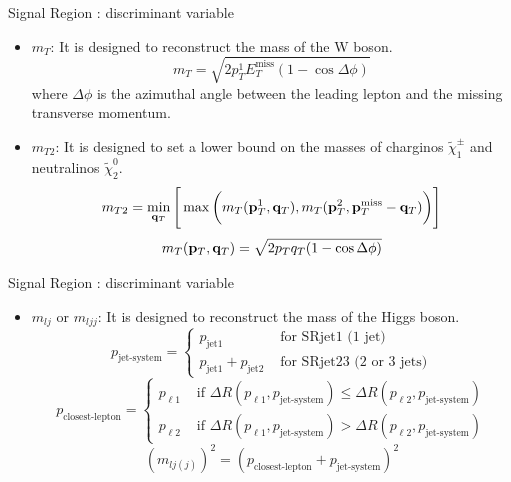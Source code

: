\documentclass[mathserif,serif]{beamer}
\begin{document}
\begin{frame}{Signal Region : discriminant variable}
\begin{itemize}
\item $m_T$: It is designed to reconstruct the mass of the W boson.
\begin{equation*}
m_T = \sqrt{ 2 p_T^1 E_T^{\text{miss}} ( 1 - \cos{\Delta\phi} ) }
\end{equation*}
where $\Delta\phi$ is the azimuthal angle between the leading lepton and the missing transverse momentum.
\item $m_{T2}$: It is designed to set a lower bound on the masses of charginos $\tilde{\chi}_1^\pm$ and neutralinos $\tilde{\chi}_2^0$.
\begin{equation*}
m_{T2} = \min_{{\bf q}_T} \Bigg[ \max \bigg( m_T( {\bf p}_T^1, {\bf q}_T ), m_T( {\bf p}_T^2, {\bf p}_T^{\text{miss}} - {\bf q}_T ) \bigg) \Bigg]
\end{equation*}
\begin{equation*}
m_T( {\bf p}_T, {\bf q}_T ) = \sqrt{ 2 p_T q_T ( 1 - \cos{\Delta\phi} ) }
\end{equation*}
\end{itemize}
\end{frame}

\begin{frame}{Signal Region : discriminant variable}
\begin{itemize}
\item $m_{lj}$ or $m_{ljj}$: It is designed to reconstruct the mass of the Higgs boson.
\begin{equation*}
p_{\text{jet-system}} =
\left\{
\begin{array}{ll}
p_{\text{jet1}} &\text{ for SRjet1 (1 jet)}\\
p_{\text{jet1}} + p_{\text{jet2}} &\text{ for SRjet23 (2 or 3 jets)}
\end{array} \right.
\end{equation*}
\begin{equation*}
p_{\text{closest-lepton}} =
\left\{
\begin{array}{ll}
p_{\ell 1} &\text{ if } \Delta R(p_{\ell 1},p_{\text{jet-system}}) \leq \Delta R(p_{\ell 2},p_{\text{jet-system}}) \\
p_{\ell 2} &\text{ if } \Delta R(p_{\ell 1},p_{\text{jet-system}}) > \Delta R(p_{\ell 2},p_{\text{jet-system}})
\end{array} \right.
\end{equation*}
\begin{equation*}
(m_{lj(j)})^2 = (p_{\text{closest-lepton}} + p_{\text{jet-system}})^2
\end{equation*}
\end{itemize}
\end{frame}
\end{document}

